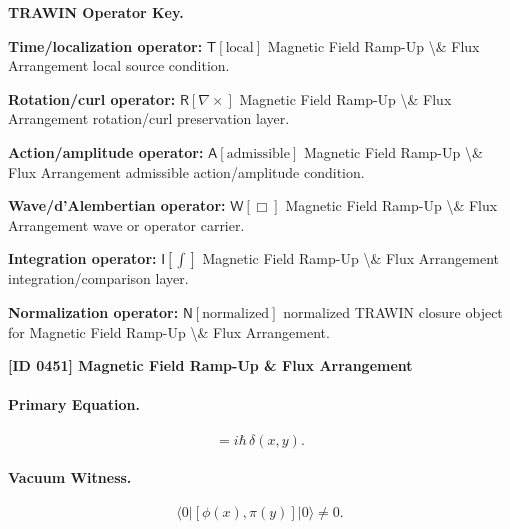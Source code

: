 \par\vspace{0.45\baselineskip}
\noindent\begin{minipage}[t]{\linewidth}
\begingroup
\small
\raggedright
\textbf{TRAWIN Operator Key.}\par
\noindent\textbf{Time/localization operator:} $\mathsf{T}\!\left[\mathrm{local}\right]$ Magnetic Field Ramp-Up \textbackslash{}\& Flux Arrangement local source condition.\par
\noindent\textbf{Rotation/curl operator:} $\mathsf{R}\!\left[\nabla\times\right]$ Magnetic Field Ramp-Up \textbackslash{}\& Flux Arrangement rotation/curl preservation layer.\par
\noindent\textbf{Action/amplitude operator:} $\mathsf{A}\!\left[\mathrm{admissible}\right]$ Magnetic Field Ramp-Up \textbackslash{}\& Flux Arrangement admissible action/amplitude condition.\par
\noindent\textbf{Wave/d'Alembertian operator:} $\mathsf{W}\!\left[\Box\right]$ Magnetic Field Ramp-Up \textbackslash{}\& Flux Arrangement wave or operator carrier.\par
\noindent\textbf{Integration operator:} $\mathsf{I}\!\left[\int\right]$ Magnetic Field Ramp-Up \textbackslash{}\& Flux Arrangement integration/comparison layer.\par
\noindent\textbf{Normalization operator:} $\mathsf{N}\!\left[\mathrm{normalized}\right]$ normalized TRAWIN closure object for Magnetic Field Ramp-Up \textbackslash{}\& Flux Arrangement.\par
\endgroup
\end{minipage}

\clearpage
\noindent\textbf{[ID 0451] Magnetic Field Ramp-Up \& Flux Arrangement}\par
\vspace{0.35em}
\paragraph{Primary Equation.}
\begin{equation}
[\phi(x),\pi(y)] = i\hbar\,\delta(x,y).
\end{equation}

\paragraph{Vacuum Witness.}
\begin{equation}
\langle 0|[\phi(x),\pi(y)]|0\rangle \neq 0 .
\end{equation}

